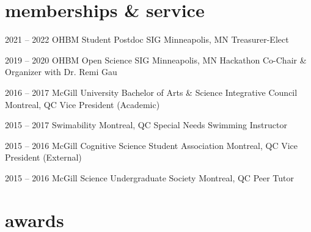\documentclass[]{friggeri-cv} %
\begin{document}


\section{memberships \& service}

\begin{entrylist}
\entry
{2021 -- 2022}
{OHBM Student Postdoc SIG}
{Minneapolis, MN}
{Treasurer-Elect}

\entry
{2019 -- 2020}
{OHBM Open Science SIG}
{Minneapolis, MN}
{Hackathon Co-Chair \& Organizer with Dr. Remi Gau}

\entry
{2016 -- 2017}
{McGill University Bachelor of Arts \& Science Integrative Council}
{Montreal, QC}
{Vice President (Academic)}

\entry
{2015 -- 2017}
{Swimability}
{Montreal, QC}
{Special Needs Swimming Instructor}

\entry
{2015 -- 2016}
{McGill Cognitive Science Student Association}
{Montreal, QC}
{Vice President (External)}
 
\entry
{2015 -- 2016}
{McGill Science Undergraduate Society}
{Montreal, QC}
{Peer Tutor}

\end{entrylist}


\section{awards}
\end{document}
